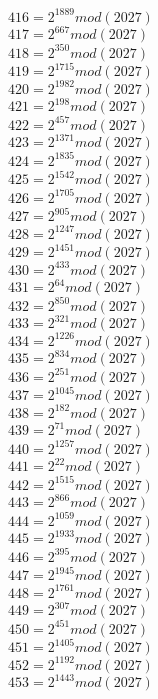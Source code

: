 \documentclass[12pt, letterpaper]{article}
\begin{document}
\begin{itemize}
\begin{multicols}{3}
$416= 2^{1889} mod (2027)$\\
$417= 2^{667} mod (2027)$\\
$418= 2^{350} mod (2027)$\\
$419= 2^{1715} mod (2027)$\\
$420= 2^{1982} mod (2027)$\\
$421= 2^{198} mod (2027)$\\
$422= 2^{457} mod (2027)$\\
$423= 2^{1371} mod (2027)$\\
$424= 2^{1835} mod (2027)$\\
$425= 2^{1542} mod (2027)$\\
$426= 2^{1705} mod (2027)$\\
$427= 2^{905} mod (2027)$\\
$428= 2^{1247} mod (2027)$\\
$429= 2^{1451} mod (2027)$\\
$430= 2^{433} mod (2027)$\\
$431= 2^{64} mod (2027)$\\
$432= 2^{850} mod (2027)$\\
$433= 2^{321} mod (2027)$\\
$434= 2^{1226} mod (2027)$\\
$435= 2^{834} mod (2027)$\\
$436= 2^{251} mod (2027)$\\
$437= 2^{1045} mod (2027)$\\
$438= 2^{182} mod (2027)$\\
$439= 2^{71} mod (2027)$\\
$440= 2^{1257} mod (2027)$\\
$441= 2^{22} mod (2027)$\\
$442= 2^{1515} mod (2027)$\\
$443= 2^{866} mod (2027)$\\
$444= 2^{1059} mod (2027)$\\
$445= 2^{1933} mod (2027)$\\
$446= 2^{395} mod (2027)$\\
$447= 2^{1945} mod (2027)$\\
$448= 2^{1761} mod (2027)$\\
$449= 2^{307} mod (2027)$\\
$450= 2^{451} mod (2027)$\\
$451= 2^{1405} mod (2027)$\\
$452= 2^{1192} mod (2027)$\\
$453= 2^{1443} mod (2027)$\\

\end{multicols}
\end{itemize}
\end{document}
